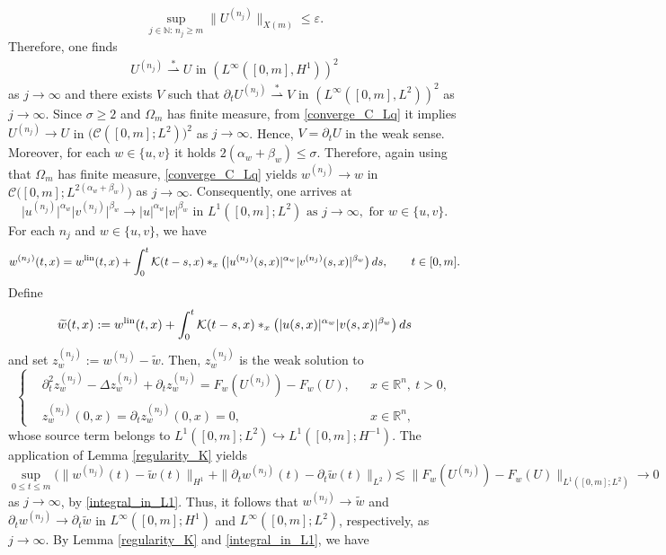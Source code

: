 \documentclass[11pt,reqno]{amsart}
\newcommand{\ity}{\infty}
\begin{document}
	\[
	\sup_{j\in \mathbb N:\,n_j\geq m}\|U^{(n_j)}\|_{X(m)}\leq \varepsilon.
	\]
	Therefore, one finds
	\begin{align*}
		U^{(n_j)}\stackrel{*}{\rightharpoonup} U\text{ in }(L^\infty([0,m],H^1))^2
	\end{align*}
	as $j\to\ity$ and there exists $V$ such that $\partial_tU^{(n_j)}\stackrel{*}{\rightharpoonup} V\text{ in }(L^\infty([0,m],L^2))^2$ as $j\to\ity$. Since $\sigma\geq2$ and $\Omega_m$ has finite measure, from \eqref{converge_C_Lq} it implies $U^{(n_j)}\to U$ in $\bigl(\mathcal{C}([0,m];L^2)\bigr)^2$ as $j\to\ity$. Hence, $V=\partial_tU$ in the weak sense. Moreover, for each $w\in\{u,v\}$ it holds $2(\alpha_w+\beta_w)\leq \sigma$. Therefore, again using that $\Omega_m$ has finite measure, \eqref{converge_C_Lq} yields $w^{(n_j)}\to w$ in $\mathcal{C}\big([0,m];L^{2(\alpha_w+\beta_w)}\big)$ as $j\to \ity$. Consequently, one arrives at
	\begin{equation}\label{integral_in_L1}
		\big|u^{(n_j)}\big|^{\alpha_w}\big|v^{(n_j)}\big|^{\beta_w}\to |u|^{\alpha_w}|v|^{\beta_w}\text{ in }L^1([0,m];L^2)\text{ as }j\to\ity, \text{ for }w\in\{u,v\}.
	\end{equation}
	For each $n_j$ and $w\in\{u,v\}$, we have
	\[
	w^{(n_j)}(t,x)=w^{\rm lin}(t,x)+\int_{0}^{t}\mathcal{K}(t-s,x)\ast_x\bigl(|u^{(n_j)}(s,x)|^{\alpha_w}|v^{(n_j)}(s,x)|^{\beta_w}\bigr)\,ds,\qquad t\in[0,m].
	\]
	Define
	\[
	\widetilde w(t,x):=w^{\rm lin}(t,x)+\int_{0}^{t}\mathcal{K}(t-s,x)\ast_x\bigl(|u(s,x)|^{\alpha_w}|v(s,x)|^{\beta_w}\bigr)\,ds
	\]
	and set $z_w^{(n_j)}:=w^{(n_j)}-\widetilde w$. Then, $z_w^{(n_j)}$ is the weak solution to
	\[
	\left\{
	\begin{aligned}
		&\partial_t^2z_w^{(n_j)}-\Delta z_w^{(n_j)}+\partial_tz_w^{(n_j)}=F_w(U^{(n_j)})-F_w(U),&&x\in\mathbb R^n,\ t>0,\\
		&z_w^{(n_j)}(0,x)=\partial_tz_w^{(n_j)}(0,x)=0,&&x\in\mathbb R^n,
	\end{aligned}
	\right.
	\]
	whose source term belongs to $L^1([0,m];L^2)\hookrightarrow
	L^1([0,m];H^{-1})$. The application of Lemma \ref{regularity_K} yields
	\[
	\sup_{0\leq t\leq m} \Big(\|w^{(n_j)}(t)-\widetilde w(t)\|_{H^1}+\|\partial_tw^{(n_j)}(t)-\partial_t\widetilde w(t)\|_{L^2}\Big)\lesssim \|F_w(U^{(n_j)})-F_w(U)\|_{L^1([0,m];L^2)}\to 0
	\]
	as $j\to\infty$, by \eqref{integral_in_L1}. Thus, it follows that $w^{(n_j)}\to \widetilde w$ and $\partial_tw^{(n_j)}\to \partial_t\widetilde w$ in $L^\infty([0,m];H^1)$ and $L^\infty([0,m];L^2)$, respectively, as $j\to \ity$. By Lemma \ref{regularity_K} and \eqref{integral_in_L1}, we have 
\end{document}
